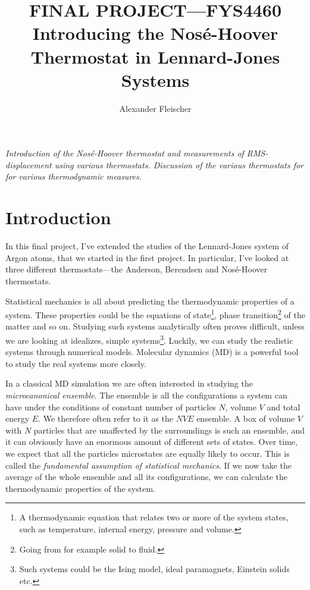 \documentclass[12pt]{article}
\title{\Huge\bfseries \MakeUppercase{Final Project---FYS4460} \\[12pt]
    \large Introducing the Nosé-Hoover Thermostat in Lennard-Jones Systems}
\author{Alexander Fleischer}
\numberwithin{equation}{section}
\numberwithin{figure}{section}
\newcommand{\ita}[1]{\textit{#1}}
\begin{document}
\maketitle
\begin{center}
\ita{Introduction of the Nosé-Hoover thermostat
    and measurements of RMS-displacement using various
    thermostats. Discussion of the various thermostats for
    for various thermodynamic measures.}
    
\end{center}



\sectionfont{\bfseries\normalsize\MakeUppercase}


\section{Introduction}
In this final project, I've extended the studies of the Lennard-Jones
system of Argon atoms, that we started in the first project. 
In particular, I've looked at three different thermostats---the
Anderson, Berendsen and Nosé-Hoover thermostats.

Statistical mechanics is all about predicting the
thermodynamic properties of a system.
These properties could be the equations of 
state\footnote{A thermodynamic equation that relates
two or more of the system states, such as temperature, internal
energy, pressure and volume.},
phase transition\footnote{Going from for example solid to fluid.} 
of the matter and so on.
Studying such systems analytically often proves difficult,
unless we are looking at idealizes, simple 
systems\footnote{Such systems could be the Ising model,
    ideal paramagnets, Einstein solids etc.}.
Luckily, we can study the realistic systems through numerical
models. Molecular dynamics (MD) is a powerful tool
to study the real systems more closely.

In a classical MD simulation we are often interested
in studying the \ita{microcanonical ensemble}.
The ensemble is all the configurations a system can have
under the conditions of constant number of particles $N$,
volume $V$ and total energy $E$.
We therefore often refer to it as the $NVE$ ensemble.
A box of volume $V$ with $N$ particles that are
unaffected by the surroundings is such an ensemble,
and it can obviously have an enormous amount of different sets of
states.
Over time, we expect that all the particles microstates are
equally likely to occur. This is called the
\ita{fundamental assumption of statistical mechanics}.
If we now take the average of the whole ensemble and all its
configurations, we can calculate the thermodynamic properties
of the system.
\end{document}
